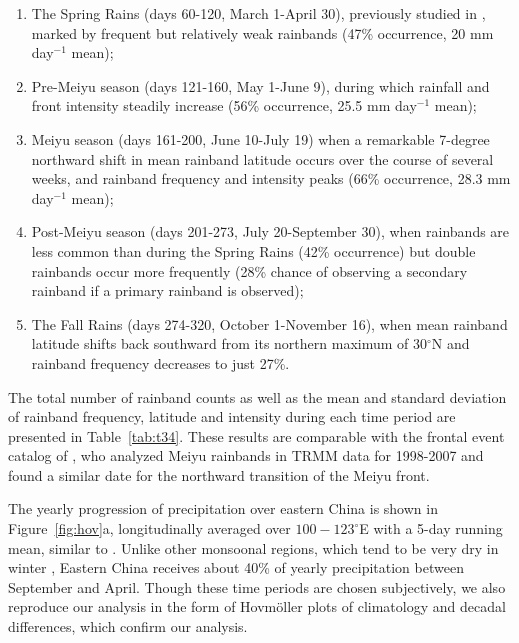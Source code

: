 \documentclass[9pt,twocolumn,twoside,lineno]{pnas-new}
\begin{document}
\begin{enumerate}

\item The Spring Rains (days 60-120, March 1-April 30), previously studied in \citet{Tian1998}, marked by frequent but relatively weak rainbands (47\% occurrence, 20 mm day$^{-1}$ mean);

\item Pre-Meiyu season (days 121-160, May 1-June 9), during which rainfall and front intensity steadily increase (56\% occurrence, 25.5 mm day$^{-1}$ mean);

\item Meiyu season (days 161-200, June 10-July 19) when a remarkable 7-degree northward shift in mean rainband latitude occurs over the course of several weeks, and rainband frequency and intensity peaks (66\% occurrence, 28.3 mm day$^{-1}$ mean); 

\item Post-Meiyu season (days 201-273, July 20-September 30), when rainbands are less common than during the Spring Rains (42\% occurrence) but double rainbands occur more frequently (28\% chance of observing a secondary rainband if a primary rainband is observed); 

\item The Fall Rains (days 274-320, October 1-November 16), when mean rainband latitude shifts back southward from its northern maximum of 30$^\circ$N and rainband frequency decreases to just 27\%. 

\end{enumerate}

	The total number of rainband counts as well as the mean and standard deviation of rainband frequency, latitude and intensity during each time period are presented in Table~\ref{tab:t34}. These results are comparable with the frontal event catalog of \citet{Xu2009}, who analyzed Meiyu rainbands in TRMM data for 1998-2007 and found a similar date for the northward transition of the Meiyu front. 

	The yearly progression of precipitation over eastern China is shown in Figure~\ref{fig:hov}a, longitudinally averaged over $100-123^\circ$E with a 5-day running mean, similar to \citet{Ding2005}. Unlike other monsoonal regions, which tend to be very dry in winter \citep{Wang2002}, Eastern China receives about 40\% of yearly precipitation between September and April. Though these time periods are chosen subjectively, we also reproduce our analysis in the form of Hovm\"oller plots of climatology and decadal differences, which confirm our analysis.
	
\end{document}
